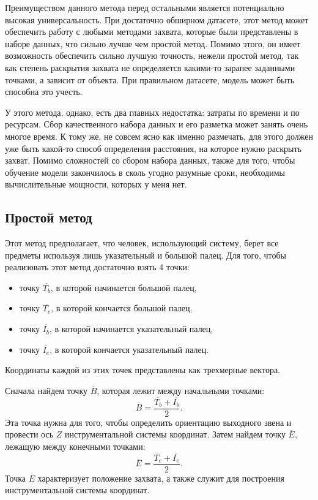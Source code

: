 \documentclass[12pt, a4paper]{article}
\begin{document}
Преимуществом данного метода перед остальными является потенциально высокая
универсальность. При достаточно обширном датасете, этот метод может обеспечить
работу с любыми методами захвата, которые были представлены в наборе данных,
что сильно лучше чем простой метод. Помимо этого, он имеет возможность
обеспечить сильно лучшую точность, нежели простой метод, так как степень
раскрытия захвата не определяется какими-то заранее заданными точками, а
зависит от объекта. При правильном датасете, модель может быть способна это
учесть.

У этого метода, однако, есть два главных недостатка: затраты по времени и по
ресурсам. Сбор качественного набора данных и его разметка может занять очень
многое время. К тому же, не совсем ясно как именно размечать, для этого должен
уже быть какой-то способ определения расстояния, на которое нужно раскрыть
захват. Помимо сложностей со сбором набора данных, также для того, чтобы
обучение модели закончилось в сколь угодно разумные сроки, необходимы
вычислительные мощности, которых у меня нет.

\subsection{Простой метод}
\label{sec:gripper_basic_method}
Этот метод предполагает, что человек, использующий систему, берет все предметы
используя лишь указательный и большой палец. 
Для того, чтобы реализовать этот метод достаточно взять 4 точки:
\begin{itemize}
  \item точку $\overline{T_b}$, в которой начинается большой палец,
  \item точку $\overline{T_e}$, в которой кончается большой палец,
  \item точку $\overline{I_b}$, в которой начинается указательный палец,
  \item точку $\overline{I_e}$, в которой кончается указательный палец.
\end{itemize}
Координаты каждой из этих точек представлены как трехмерные вектора.

Сначала найдем точку $\overline{B}$, которая лежит между начальными точками:
\begin{equation}
  \overline{B} = \frac{\overline{T_b} + \overline{I_b}}{2}.
\end{equation}
Эта точка нужна для того, чтобы определить ориентацию выходного звена и
провести ось $Z$ инструментальной системы координат.
Затем найдем точку $\overline{E}$, лежащую между конечными точками:
\begin{equation}
  \overline{E} = \frac{\overline{T_e} + \overline{I_e}}{2}.
\end{equation}
Точка $\overline{E}$ характеризует положение захвата, а также служит для
построения инструментальной системы координат.
\end{document}
